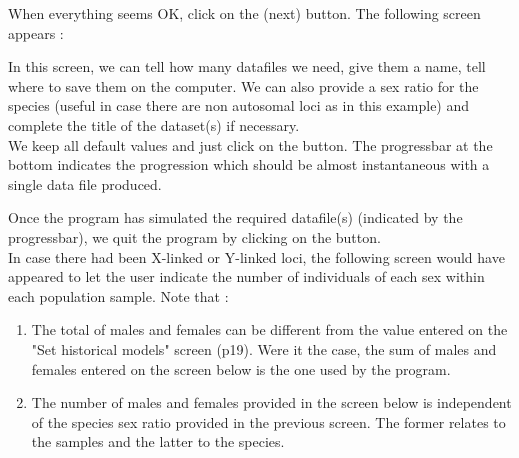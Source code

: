 When everything seems OK, click on the  \fbox{$>>$} (next) button. The following screen appears :


In this screen, we can tell how many datafiles we need, give them a name, tell where to save them on the computer. We can also provide a sex ratio for the species (useful in case there are non autosomal loci as in this example) and complete the title of the dataset(s) if necessary.\\

We keep all default values and just click on the  button. The progressbar at the bottom indicates the progression which should be almost instantaneous with a single data file produced.

\newpage


Once the program has simulated the required datafile(s) (indicated by the progressbar), we quit the program by clicking on the 
button.\\


 In case there had been X-linked or Y-linked loci, the following screen would have appeared to let the user indicate the number of individuals of each sex within each population sample. Note that :
 \begin{enumerate}
 \item The total of males and females can be different from the value entered on the "Set historical models" screen (p19). Were it the case, the sum of males and females entered on the screen below is the one used by the program.
 \item The number of males and females provided in the screen below is independent of the species sex ratio provided in the previous screen. The former relates to the samples and the latter to the species.
 \end{enumerate}


